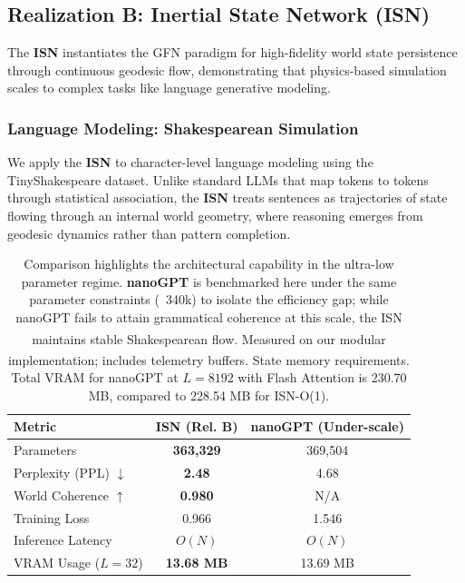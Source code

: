 \documentclass[12pt,a4paper]{article}
\begin{document}
\subsection{Realization B: Inertial State Network (ISN)}
\label{sec:reality-model-experiments}

The \textbf{ISN} instantiates the GFN paradigm for high-fidelity world state persistence through continuous geodesic flow, demonstrating that physics-based simulation scales to complex tasks like language generative modeling.

\subsubsection{Language Modeling: Shakespearean Simulation}
\label{sec:language-experiment}

We apply the \textbf{ISN} to character-level language modeling using the TinyShakespeare dataset. Unlike standard LLMs that map tokens to tokens through statistical association, the \textbf{ISN} treats sentences as trajectories of state flowing through an internal world geometry, where reasoning emerges from geodesic dynamics rather than pattern completion.

\begin{table}[htbp]
    \centering
    \caption{ISN Language Performance (Epoch 29) on TinyShakespeare.}
    \label{tab:language-results}
    \begin{tabular}{lcc}
        \toprule
        \textbf{Metric} & \textbf{ISN (Rel. B)} & \textbf{nanoGPT (Under-scale)} \\
        \midrule
        Parameters & \textbf{363,329} & 369,504 \\
        Perplexity (PPL) $\downarrow$ & \textbf{2.48} & 4.68 \\
        World Coherence $\uparrow$ & \textbf{0.980} & N/A \\
        Training Loss & 0.966 & 1.546 \\
        Inference Latency & $O(N)$ & $O(N)$ \\
        VRAM Usage ($L=32$) & \textbf{13.68 MB} & 13.69 MB \\
        \bottomrule
    \end{tabular}
    \vspace{2pt}
    \caption*{\small Comparison highlights the architectural capability in the ultra-low parameter regime. \textbf{nanoGPT} is benchmarked here under the same parameter constraints (~340k) to isolate the efficiency gap; while nanoGPT fails to attain grammatical coherence at this scale, the ISN maintains stable Shakespearean flow. \textsuperscript{\textdagger}Measured on our modular implementation; includes telemetry buffers. \textsuperscript{\textdaggerdbl}State memory requirements. Total VRAM for nanoGPT at $L=8192$ with Flash Attention is 230.70 MB, compared to 228.54 MB for ISN-O(1).}
\end{table}
\end{document}
